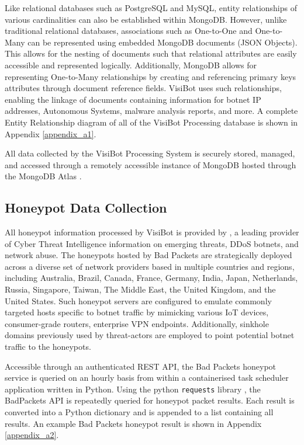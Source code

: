 Like relational databases such as PostgreSQL and MySQL, entity relationships of various cardinalities can also be established within MongoDB. However, unlike traditional relational databases, associations such as One-to-One and One-to-Many can be represented using embedded MongoDB documents (JSON Objects). This allows for the nesting of documents such that relational attributes are easily accessible and represented logically. Additionally, MongoDB allows for representing One-to-Many relationships by creating and referencing primary keys attributes through document reference fields. VisiBot uses such relationships, enabling the linkage of documents containing information for botnet IP addresses, Autonomous Systems, malware analysis reports, and more. A complete Entity Relationship diagram of all of the VisiBot Processing database is shown in Appendix \ref{appendix_a1}.

All data collected by the VisiBot Processing System is securely stored, managed, and accessed through a remotely accessible instance of MongoDB hosted through the MongoDB Atlas \citep{MongoDBAtlas}.

\subsection{Honeypot Data Collection}

All honeypot information processed by VisiBot is provided by \citet{BadPackets}, a leading provider of Cyber Threat Intelligence information on emerging threats, DDoS botnets, and network abuse. The honeypots hosted by Bad Packets are strategically deployed across a diverse set of network providers based in multiple countries and regions, including Australia, Brazil, Canada, France, Germany, India, Japan, Netherlands, Russia, Singapore, Taiwan, The Middle East, the United Kingdom, and the United States. Such honeypot servers are configured to emulate commonly targeted hosts specific to botnet traffic by mimicking various IoT devices, consumer-grade routers, enterprise VPN endpoints. Additionally, sinkhole domains previously used by threat-actors are employed to point potential botnet traffic to the honeypots.

Accessible through an authenticated REST API, the Bad Packets honeypot service is queried on an hourly basis from within a containerised task scheduler application written in Python. Using the python \texttt{requests} library \citep{PythonRequests}, the BadPackets API is repeatedly queried for honeypot packet results. Each result is converted into a Python dictionary and is appended to a list containing all results. An example Bad Packets honeypot result is shown in Appendix \ref{appendix_a2}.

